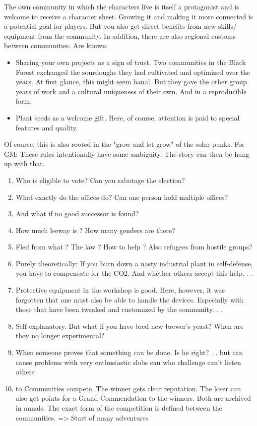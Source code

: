 The own community in which the characters live is itself a protagonist and is welcome to receive a character sheet. Growing it and making it more connected is a potential goal for players. But you also get direct benefits from new skills/ equipment from the community.
In addition, there are also regional customs between communities. Are known:
\begin{itemize}
    \item Sharing your own projects as a sign of trust. Two communities in the Black Forest exchanged the sourdoughs they had cultivated and optimized over the years. At first glance, this might seem banal. But they gave the other group years of work and a cultural uniqueness of their own. And in a reproducible form.
    \item Plant seeds as a welcome gift. Here, of course, attention is paid to special features and quality. 
\end{itemize}
Of course, this is also rooted in the "grow and let grow" of the solar punks.
For GM: These rules intentionally have some ambiguity. The story can then be hung up with that.
\begin{enumerate}
    \item Who is eligible to vote? Can you sabotage the election?
    \item What exactly do the offices do? Can one person hold multiple offices?
    \item And what if no good successor is found?
    \item How much leeway is ? How many genders are there?
    \item Fled from what ? The law ? How to help ? Also refugees from hostile groups?
    \item Purely theoretically: If you burn down a nasty industrial plant in self-defense, you have to compensate for the CO2. And whether others accept this help. . . 
    \item Protective equipment in the workshop is good. Here, however, it was forgotten that one must also be able to handle the devices. Especially with those that have been tweaked and customized by the community. . . 
    \item  Self-explanatory. But what if you have bred new brewer's yeast? When are they no longer experimental? 
    \item When someone proves that something can be done. Is he right? . . but can cause problems with very enthusiastic slobs can who challenge can't listen others
    \item to Communities compete. The winner gets clear reputation. The loser can also get points for a Grand Commendation to the winners. Both are archived in annals. The exact form of the competition is defined between the communities. => Start of many adventures
\end{enumerate}


